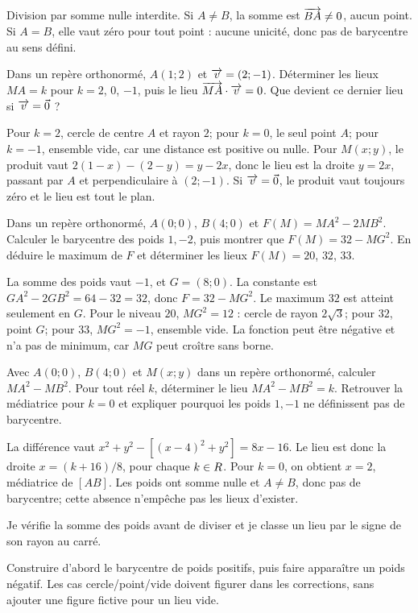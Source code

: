\begin{corrige}\label{sol-t11s-c14-e07}
Division par somme nulle interdite. Si $A\ne B$, la somme est $\overrightarrow{BA}\ne0$, aucun point. Si $A=B$, elle vaut zéro pour tout point : aucune unicité, donc pas de barycentre au sens défini.
\end{corrige}
\label{t11s-c14-e08}
Dans un repère orthonormé, $A(1;2)$ et $\overrightarrow{v}=(2;-1)$. Déterminer les lieux $MA=k$ pour $k=2$, $0$, $-1$, puis le lieu $\overrightarrow{MA}\cdot\overrightarrow{v}=0$. Que devient ce dernier lieu si $\overrightarrow{v}=\vec0$ ?
\begin{corrige}\label{sol-t11s-c14-e08}
Pour $k=2$, cercle de centre $A$ et rayon $2$; pour $k=0$, le seul point $A$; pour $k=-1$, ensemble vide, car une distance est positive ou nulle. Pour $M(x;y)$, le produit vaut $2(1-x)-(2-y)=y-2x$, donc le lieu est la droite $y=2x$, passant par $A$ et perpendiculaire à $(2;-1)$. Si $\overrightarrow{v}=\vec0$, le produit vaut toujours zéro et le lieu est tout le plan.
\end{corrige}

\label{t11s-c14-p01}
Dans un repère orthonormé, $A(0;0)$, $B(4;0)$ et $F(M)=MA^2-2MB^2$. Calculer le barycentre des poids $1,-2$, puis montrer que $F(M)=32-MG^2$. En déduire le maximum de $F$ et déterminer les lieux $F(M)=20$, $32$, $33$.
\begin{corrige}\label{sol-t11s-c14-p01}
La somme des poids vaut $-1$, et $G=(8;0)$. La constante est $GA^2-2GB^2=64-32=32$, donc $F=32-MG^2$. Le maximum $32$ est atteint seulement en $G$. Pour le niveau $20$, $MG^2=12$ : cercle de rayon $2\sqrt3$; pour $32$, point $G$; pour $33$, $MG^2=-1$, ensemble vide. La fonction peut être négative et n’a pas de minimum, car $MG$ peut croître sans borne.
\end{corrige}
\label{t11s-c14-p02}
Avec $A(0;0)$, $B(4;0)$ et $M(x;y)$ dans un repère orthonormé, calculer $MA^2-MB^2$. Pour tout réel $k$, déterminer le lieu $MA^2-MB^2=k$. Retrouver la médiatrice pour $k=0$ et expliquer pourquoi les poids $1,-1$ ne définissent pas de barycentre.
\begin{corrige}\label{sol-t11s-c14-p02}
La différence vaut $x^2+y^2-[(x-4)^2+y^2]=8x-16$. Le lieu est donc la droite $x=(k+16)/8$, pour chaque $k\in R$. Pour $k=0$, on obtient $x=2$, médiatrice de $[AB]$. Les poids ont somme nulle et $A\ne B$, donc pas de barycentre; cette absence n’empêche pas les lieux d’exister.
\end{corrige}

\begin{jemeteste}Je vérifie la somme des poids avant de diviser et je classe un lieu par le signe de son rayon au carré.\end{jemeteste}
\begin{notepourlaclasse}Construire d’abord le barycentre de poids positifs, puis faire apparaître un poids négatif. Les cas cercle/point/vide doivent figurer dans les corrections, sans ajouter une figure fictive pour un lieu vide.\end{notepourlaclasse}
